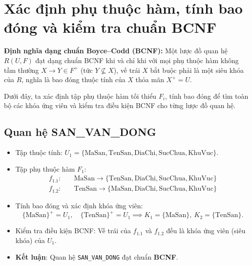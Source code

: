 \section{Xác định phụ thuộc hàm, tính bao đóng và kiểm tra chuẩn BCNF}

\textbf{Định nghĩa dạng chuẩn Boyce--Codd (BCNF):} Một lược đồ quan hệ $R(U, F)$ đạt dạng chuẩn BCNF khi và chỉ khi với mọi phụ thuộc hàm không tầm thường $X \rightarrow Y \in F^+$ (tức $Y \nsubseteq X$), vế trái $X$ bắt buộc phải là một siêu khóa của $R$, nghĩa là bao đóng thuộc tính của $X$ thỏa mãn $X^+ = U$.

Dưới đây, ta xác định tập phụ thuộc hàm tối thiểu $F_i$, tính bao đóng để tìm toàn bộ các khóa ứng viên và kiểm tra điều kiện BCNF cho từng lược đồ quan hệ.

\subsection{Quan hệ SAN\_VAN\_DONG}
\begin{itemize}
    \item Tập thuộc tính: $U_1 = \{\text{MaSan}, \text{TenSan}, \text{DiaChi}, \text{SucChua}, \text{KhuVuc}\}$.
    \item Tập phụ thuộc hàm $F_1$:
    \begin{align*}
        f_{1.1}: & \quad \text{MaSan} \rightarrow \{\text{TenSan}, \text{DiaChi}, \text{SucChua}, \text{KhuVuc}\} \\
        f_{1.2}: & \quad \text{TenSan} \rightarrow \{\text{MaSan}, \text{DiaChi}, \text{SucChua}, \text{KhuVuc}\}
    \end{align*}
    \item Tính bao đóng và xác định khóa ứng viên:
    $$\{\text{MaSan}\}^+ = U_1, \quad \{\text{TenSan}\}^+ = U_1 \implies K_1 = \{\text{MaSan}\}, \ K_2 = \{\text{TenSan}\}.$$
    \item Kiểm tra điều kiện BCNF: Vế trái của $f_{1.1}$ và $f_{1.2}$ đều là khóa ứng viên (siêu khóa) của $U_1$.
    \item \textbf{Kết luận}: Quan hệ \texttt{SAN\_VAN\_DONG} đạt chuẩn \textbf{BCNF}.
\end{itemize}

